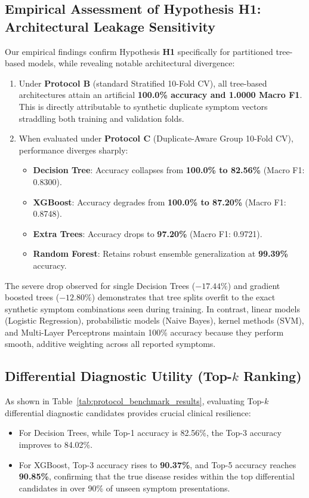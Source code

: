 \subsection{Empirical Assessment of Hypothesis H1: Architectural Leakage Sensitivity}
\label{subsec:h1_assessment}
Our empirical findings confirm Hypothesis \textbf{H1} specifically for partitioned tree-based models, while revealing notable architectural divergence:
\begin{enumerate}
    \item Under \textbf{Protocol B} (standard Stratified 10-Fold CV), all tree-based architectures attain an artificial \textbf{100.0\% accuracy and 1.0000 Macro F1}. This is directly attributable to synthetic duplicate symptom vectors straddling both training and validation folds.
    \item When evaluated under \textbf{Protocol C} (Duplicate-Aware Group 10-Fold CV), performance diverges sharply:
    \begin{itemize}
        \item \textbf{Decision Tree}: Accuracy collapses from \textbf{100.0\% to 82.56\%} (Macro F1: 0.8300).
        \item \textbf{XGBoost}: Accuracy degrades from \textbf{100.0\% to 87.20\%} (Macro F1: 0.8748).
        \item \textbf{Extra Trees}: Accuracy drops to \textbf{97.20\%} (Macro F1: 0.9721).
        \item \textbf{Random Forest}: Retains robust ensemble generalization at \textbf{99.39\%} accuracy.
    \end{itemize}
\end{enumerate}

The severe drop observed for single Decision Trees ($-17.44\%$) and gradient boosted trees ($-12.80\%$) demonstrates that tree splits overfit to the exact synthetic symptom combinations seen during training. In contrast, linear models (Logistic Regression), probabilistic models (Naive Bayes), kernel methods (SVM), and Multi-Layer Perceptrons maintain 100\% accuracy because they perform smooth, additive weighting across all reported symptoms.

\subsection{Differential Diagnostic Utility (Top-\texorpdfstring{$k$}{k} Ranking)}
\label{subsec:topk_utility}
As shown in Table~\ref{tab:protocol_benchmark_results}, evaluating Top-$k$ differential diagnostic candidates provides crucial clinical resilience:
\begin{itemize}
    \item For Decision Trees, while Top-1 accuracy is 82.56\%, the Top-3 accuracy improves to 84.02\%.
    \item For XGBoost, Top-3 accuracy rises to \textbf{90.37\%}, and Top-5 accuracy reaches \textbf{90.85\%}, confirming that the true disease resides within the top differential candidates in over 90\% of unseen symptom presentations.
\end{itemize}

